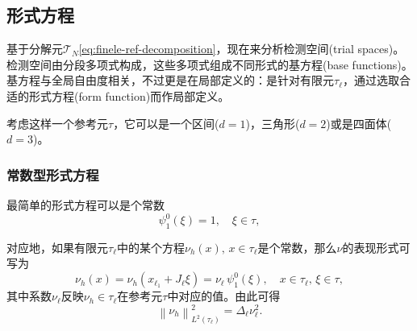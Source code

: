 \subsection{形式方程}
\label{sec:finele-form}
基于分解元$\mathcal{T}_{N}$\eqref{eq:finele-ref-decomposition}，现在来分析检测空间(trial spaces)。检测空间由分段多项式构成，这些多项式组成不同形式的基方程(base functions)。基方程与全局自由度相关，不过更是在局部定义的：是针对有限元$\tau_{\ell}$，通过选取合适的形式方程(form function)而作局部定义。

考虑这样一个参考元$\tau$，它可以是一个区间($d=1$)，三角形($d=2$)或是四面体($d=3$)。

\subsubsection{常数型形式方程}
最简单的形式方程可以是个常数
\begin{equation*}
  \psi_{1}^{0}(\xi) = 1, \quad \xi \in \tau,
\end{equation*}

对应地，如果有限元$\tau_{\ell}$中的某个方程$\nu_{h}(x), \, x \in \tau_{\ell}$是个常数，那么$\nu$的表现形式可写为
\begin{equation*}
  \nu_{h}(x) = \nu_{h} \left( x_{\ell_{1}} + J_{\ell} \xi \right)
  =\nu_{\ell} \, \psi_{1}^{0}(\xi), \quad x \in \tau_{\ell}, \, \xi \in \tau,
\end{equation*}
其中系数$\nu_{\ell}$反映$\nu_{h} \in \tau_{\ell}$在参考元$\tau$中对应的值。由此可得
\begin{equation}
  \label{eq:finele-form-constant-norm}
  \left\| \nu_{h} \right\|_{L^{2}(\tau_{\ell})}^{2} = \Delta_{\ell} \nu_{\ell}^{2}.
\end{equation}

